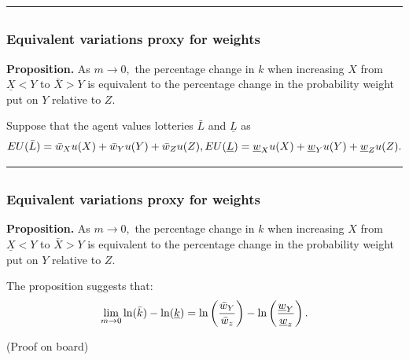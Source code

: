 \documentclass[
  letterpaper,
  DIV=11,
  numbers=noendperiod]{scrartcl}
\begin{document}
\begin{center}\rule{0.5\linewidth}{0.5pt}\end{center}

\subsection{}\label{section-16}

\subsubsection{Equivalent variations proxy for
weights}\label{equivalent-variations-proxy-for-weights}

\textbf{Proposition.} As \(m\to 0,\) the percentage change in \(k\) when
increasing \(X\) from \(\underline{X} < Y\) to \(\bar{X} > Y\) is
equivalent to the percentage change in the probability weight put on
\(Y\) relative to \(Z.\)

Suppose that the agent values lotteries \(\bar{L}\) and
\(\underline{L}\) as \[
\small
EU(\bar{L}) = \bar{w}_X u(X) + \bar{w}_Y u(Y) + \bar{w}_Z u(Z),\, \\
\small
EU(\underline{L}) = \underline{w}_X u(X) + \underline{w}_Y u(Y) + \underline{w}_Z u(Z).
\]

\begin{center}\rule{0.5\linewidth}{0.5pt}\end{center}

\subsection{}\label{section-17}

\subsubsection{Equivalent variations proxy for
weights}\label{equivalent-variations-proxy-for-weights-1}

\textbf{Proposition.} As \(m\to 0,\) the percentage change in \(k\) when
increasing \(X\) from \(\underline{X} < Y\) to \(\bar{X} > Y\) is
equivalent to the percentage change in the probability weight put on
\(Y\) relative to \(Z.\)

The proposition suggests that: \[
\small \lim_{m\to 0} \ln(\bar{k}) - \ln(\underline{k}) = \ln\left(\frac{\bar{w}_Y}{\bar{w}_z}\right) - \ln\left(\frac{\underline{w}_Y}{\underline{w}_z}\right).
\]

(Proof on board)
\end{document}
